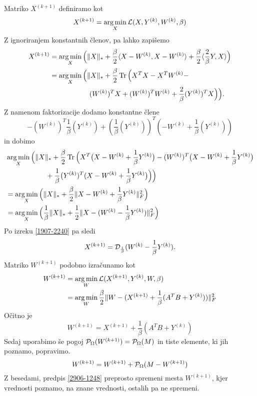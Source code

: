 Matriko $X^{(k+1)}$ definiramo kot
\[
    X^{(k+1)} = \operatorname*{arg\,min}_X \mathcal{L}(X, Y^{(k)}, W^{(k)}, \beta)
\]
Z ignoriranjem konstantnih členov, pa lahko zapišemo
\begin{align*}
    X^{(k+1)} & = \operatorname*{arg\,min}_X \Big( \lVert X\rVert_* + \frac{\beta}{2}\langle X-W^{(k)}, X-W^{(k)} \rangle + \frac{\beta}{2}\langle \frac{2}{\beta}Y, X \rangle \Big) \\
              & = \operatorname*{arg\,min}_X \Big( \lVert X\rVert_* + \frac{\beta}{2}\operatorname{Tr}\Big(X^TX - X^TW^{(k)} -                                                   \\
              & \hspace{2cm} (W^{(k)})^TX + (W^{(k)})^TW^{(k)} + \frac{2}{\beta}(Y^{(k)})^TX \Big)\Big).
\end{align*}
Z namenom faktorizacije dodamo konstantne člene
\[-(W^{(k)})^T\frac{1}{\beta}(Y^{(k)}) + (\frac{1}{\beta}(Y^{(k)}))^T(-W^{(k)} + \frac{1}{\beta}(Y^{(k)}))\]
in dobimo
\begin{align*}
     & \operatorname*{arg\,min}_X \Big( \lVert X\rVert_* + \frac{\beta}{2}\operatorname{Tr}\Big(X^T\big(X - W^{(k)} + \frac{1}{\beta}Y^{(k)}\big) - (W^{(k)})^T \big(X - W^{(k)} + \frac{1}{\beta}Y^{(k)}\big) \\
     & \hspace{2cm} +\frac{1}{\beta}\big(Y^{(k)})^T(X - W^{(k)} + \frac{1}{\beta}Y^{(k)}\big)\Big) \Big)                                                                 \\
     & = \operatorname*{arg\,min}_X \Big( \lVert X\rVert_* + \frac{\beta}{2} \lVert X-W^{(k)} + \frac{1}{\beta}Y^{(k)}\rVert_F^2 \Big)                                                                        \\
     & = \operatorname*{arg\,min}_X \Big( \frac{1}{\beta}\lVert X\rVert_* +  \frac{1}{2}\lVert X-(W^{(k)} - \frac{1}{\beta}Y^{(k)})\rVert_F^2\Big)  
\end{align*}
Po izreku \ref{1907-2240}  pa sledi
\[
    X^{(k+1)} = \mathcal{D}_\frac{1}{\beta}(W^{(k)} - \frac{1}{\beta} Y^{(k)}).
\]
Matriko $W^{(k+1)}$ podobno izračunamo kot
\begin{align*}
    W^{(k+1)} & = \operatorname*{arg\,min}_{W} \mathcal{L}(X^{(k+1)}, Y^{(k)}, W, \beta)                                   \\
              & = \operatorname*{arg\,min}_W \frac{\beta}{2} \lVert W - (X^{(k+1)} + \frac{1}{\beta}(A^T B + Y^{(k)})) \rVert_F^2
\end{align*}
Očitno je
\[
    W^{(k+1)} = X^{(k+1)} + \frac{1}{\beta}(A^T B + Y^{(k)})
\]
Sedaj uporabimo še pogoj $\mathcal{P}_\Omega(W^{(k+1)}) = \mathcal{P}_\Omega(M)$ in tiste elemente, ki jih poznamo, popravimo.
\begin{equation}
    \label{2906-1248}
    W^{(k+1)} = W^{(k+1)} + \mathcal{P}_\Omega(M - W^{(k+1)})
\end{equation}
Z besedami, predpis \eqref{2906-1248}
preprosto spremeni mesta $W^{(k+1)}$, kjer vrednosti poznamo, na znane vrednosti, ostalih pa ne spremeni.
